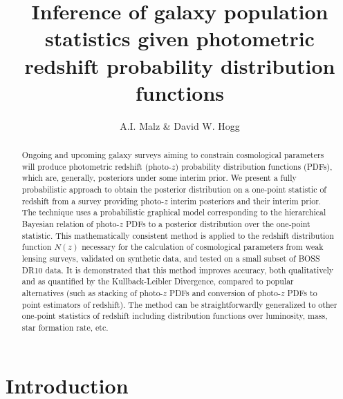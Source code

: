 \documentclass[preprint]{aastex}
\begin{document}
\title{Inference of galaxy population statistics given photometric redshift 
probability distribution functions}

\author{A.I. Malz \& David W. Hogg}


\begin{abstract}
Ongoing and upcoming galaxy surveys aiming to constrain cosmological parameters 
will produce photometric redshift (photo-$z$) probability distribution 
functions (PDFs), which are, generally, posteriors under some interim prior.  
We present a fully probabilistic approach to obtain the posterior distribution 
on a one-point statistic of redshift from a survey providing photo-$z$ interim 
posteriors and their interim prior.  The technique uses a probabilistic 
graphical model corresponding to the hierarchical Bayesian relation of 
photo-$z$ PDFs to a posterior distribution over the one-point statistic.  This 
mathematically consistent method is applied to the redshift distribution 
function $N(z)$ necessary for the calculation of cosmological parameters from 
weak lensing surveys, validated on synthetic data, and tested on a small subset 
of BOSS DR10 data.  It is demonstrated that this method improves accuracy, both 
qualitatively and as quantified by the Kullback-Leibler Divergence, compared to 
popular alternatives (such as stacking of photo-$z$ PDFs and conversion of 
photo-$z$ PDFs to point estimators of redshift).  The method can be 
straightforwardly generalized to other one-point statistics of redshift 
including distribution functions over luminosity, mass, star formation rate, 
etc.
\end{abstract}


\section{Introduction}
\label{sec:intro}
\end{document}
